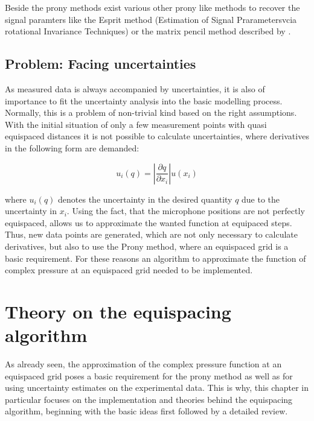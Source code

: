 \documentclass[11pt]{report} %
\begin{document}
Beside the prony methods exist various other prony like methods to recover the signal paramters like the Esprit method (Estimation of Signal Prarametersvcia rotational Invariance Techniques) or the matrix pencil method described by \cite{Peter2011}.

\section{Problem: Facing uncertainties}
As measured data is always accompanied by uncertainties, it is also of importance to fit the uncertainty analysis into the basic modelling process.
Normally, this is a problem of non-trivial kind based on the right assumptions.
With the initial situation of only a few measurement points with quasi equispaced distances it is not possible to calculate uncertainties, where derivatives in the following form are demanded:

\begin{equation}
u_{i}(q)= \left\vert \frac{\partial q}{\partial x_{i}} \right\vert u( x_{i})
\end{equation}

where $u_{i}(q)$ denotes the uncertainty in the desired quantity $q$ due to the uncertainty in $x_{i}$.
Using the fact, that the microphone positions are not perfectly equispaced, allows us to approximate the wanted function at equipaced steps.
Thus, new data points are generated, which are not only necessary to calculate derivatives, but also to use the Prony method, where an equispaced grid is a basic requirement.
For these reasons an algorithm to approximate the function of complex pressure at an equispaced grid needed to be implemented. 
  
\chapter{Theory on the equispacing algorithm} 
As already seen, the approximation of the complex pressure function at an equispaced grid poses a basic requirement for the prony method as well as for using uncertainty estimates on the experimental data.
This is why, this chapter in particular focuses on the implementation and theories behind the equispacing algorithm, beginning with the basic ideas first followed by a detailed review. 
\end{document}
